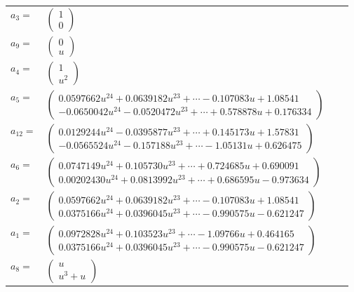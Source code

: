 \documentclass[1p]{elsarticle_modified}
\theoremstyle{definition}
\begin{document}
\begin{tabular}{m{7pt} m{180pt} m{7pt} m{180pt} }
\flushright $a_{3}=$&$\begin{pmatrix}1\\0\end{pmatrix}$ \\
\flushright $a_{9}=$&$\begin{pmatrix}0\\u\end{pmatrix}$ \\
\flushright $a_{4}=$&$\begin{pmatrix}1\\u^2\end{pmatrix}$ \\
\flushright $a_{5}=$&$\begin{pmatrix}0.0597662 u^{24}+0.0639182 u^{23}+\cdots-0.107083 u+1.08541\\-0.0650042 u^{24}-0.0520472 u^{23}+\cdots+0.578878 u+0.176334\end{pmatrix}$ \\
\flushright $a_{12}=$&$\begin{pmatrix}0.0129244 u^{24}-0.0395877 u^{23}+\cdots+0.145173 u+1.57831\\-0.0565524 u^{24}-0.157188 u^{23}+\cdots-1.05131 u+0.626475\end{pmatrix}$ \\
\flushright $a_{6}=$&$\begin{pmatrix}0.0747149 u^{24}+0.105730 u^{23}+\cdots+0.724685 u+0.690091\\0.00202430 u^{24}+0.0813992 u^{23}+\cdots+0.686595 u-0.973634\end{pmatrix}$ \\
\flushright $a_{2}=$&$\begin{pmatrix}0.0597662 u^{24}+0.0639182 u^{23}+\cdots-0.107083 u+1.08541\\0.0375166 u^{24}+0.0396045 u^{23}+\cdots-0.990575 u-0.621247\end{pmatrix}$ \\
\flushright $a_{1}=$&$\begin{pmatrix}0.0972828 u^{24}+0.103523 u^{23}+\cdots-1.09766 u+0.464165\\0.0375166 u^{24}+0.0396045 u^{23}+\cdots-0.990575 u-0.621247\end{pmatrix}$ \\
\flushright $a_{8}=$&$\begin{pmatrix}u\\u^3+u\end{pmatrix}$ \\

\end{tabular}
\end{document}
